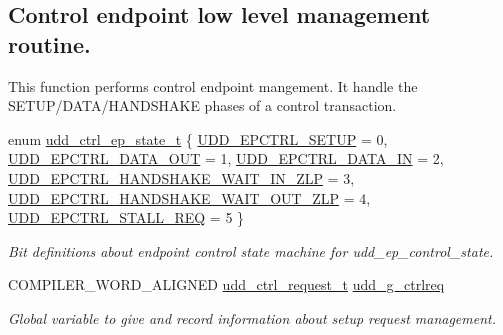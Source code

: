 \subsection*{\-Control endpoint low level management routine.}
\label{_amgrpc60f904f933dd5c177261b92bc2abc62}%
 \-This function performs control endpoint mangement. \-It handle the \-S\-E\-T\-U\-P/\-D\-A\-T\-A/\-H\-A\-N\-D\-S\-H\-A\-K\-E phases of a control transaction. \begin{DoxyCompactItemize}
\item 
enum \hyperlink{group__udd__group_gabc925782d47feeb37f6f943579038b84}{udd\-\_\-ctrl\-\_\-ep\-\_\-state\-\_\-t} \{ \*
\hyperlink{group__udd__group_ggabc925782d47feeb37f6f943579038b84a2357a1ac77f59da70848f4121a016e77}{\-U\-D\-D\-\_\-\-E\-P\-C\-T\-R\-L\-\_\-\-S\-E\-T\-U\-P} =  0, 
\hyperlink{group__udd__group_ggabc925782d47feeb37f6f943579038b84acf3cc280a0061ecf321e0191d37dc53c}{\-U\-D\-D\-\_\-\-E\-P\-C\-T\-R\-L\-\_\-\-D\-A\-T\-A\-\_\-\-O\-U\-T} =  1, 
\hyperlink{group__udd__group_ggabc925782d47feeb37f6f943579038b84a57e63cb5de1f85c276dbfa8c3c00deed}{\-U\-D\-D\-\_\-\-E\-P\-C\-T\-R\-L\-\_\-\-D\-A\-T\-A\-\_\-\-I\-N} =  2, 
\hyperlink{group__udd__group_ggabc925782d47feeb37f6f943579038b84aadbf4f42e07b8589262e727b3cf8b900}{\-U\-D\-D\-\_\-\-E\-P\-C\-T\-R\-L\-\_\-\-H\-A\-N\-D\-S\-H\-A\-K\-E\-\_\-\-W\-A\-I\-T\-\_\-\-I\-N\-\_\-\-Z\-L\-P} =  3, 
\*
\hyperlink{group__udd__group_ggabc925782d47feeb37f6f943579038b84ae5dd6cabf3ebb1aab6a80d7a92a89513}{\-U\-D\-D\-\_\-\-E\-P\-C\-T\-R\-L\-\_\-\-H\-A\-N\-D\-S\-H\-A\-K\-E\-\_\-\-W\-A\-I\-T\-\_\-\-O\-U\-T\-\_\-\-Z\-L\-P} =  4, 
\hyperlink{group__udd__group_ggabc925782d47feeb37f6f943579038b84a8d44562cd9ac18661adcf35015f8972e}{\-U\-D\-D\-\_\-\-E\-P\-C\-T\-R\-L\-\_\-\-S\-T\-A\-L\-L\-\_\-\-R\-E\-Q} =  5
 \}
\begin{DoxyCompactList}\small\item\em \-Bit definitions about endpoint control state machine for udd\-\_\-ep\-\_\-control\-\_\-state. \end{DoxyCompactList}\item 
\-C\-O\-M\-P\-I\-L\-E\-R\-\_\-\-W\-O\-R\-D\-\_\-\-A\-L\-I\-G\-N\-E\-D \*
\hyperlink{structudd__ctrl__request__t}{udd\-\_\-ctrl\-\_\-request\-\_\-t} \hyperlink{group__udd__group_ga2a41c2b14c5be825bdce7fde8c365a30}{udd\-\_\-g\-\_\-ctrlreq}
\begin{DoxyCompactList}\small\item\em \-Global variable to give and record information about setup request management. \end{DoxyCompactList}\end{DoxyCompactItemize}
